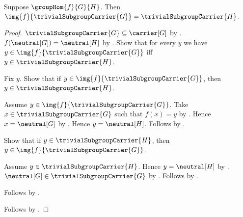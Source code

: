 \begin{proposition}\label{group_hom_image_trivial_subgroup}
    Suppose $\groupHom{f}{G}{H}$.
    Then
        $\img{f}{\trivialSubgroupCarrier{G}}=
            \trivialSubgroupCarrier{H}$.
\end{proposition}
\begin{proof}
    $\trivialSubgroupCarrier{G}\subseteq\carrier[G]$ by
        .
    $f(\neutral[G])=\neutral[H]$ by .
    Show that for every $y$ we have
        $y\in\img{f}{\trivialSubgroupCarrier{G}}$ iff
        $y\in\trivialSubgroupCarrier{H}$.
    \begin{subproof}
        Fix $y$.
        Show that if $y\in\img{f}{\trivialSubgroupCarrier{G}}$, then
            $y\in\trivialSubgroupCarrier{H}$.
        \begin{subproof}
            Assume $y\in\img{f}{\trivialSubgroupCarrier{G}}$.
            Take $x\in\trivialSubgroupCarrier{G}$ such that $f(x)=y$ by
                .
            Hence $x=\neutral[G]$ by
                .
            Hence $y=\neutral[H]$.
            Follows by .
        \end{subproof}
        Show that if $y\in\trivialSubgroupCarrier{H}$, then
            $y\in\img{f}{\trivialSubgroupCarrier{G}}$.
        \begin{subproof}
            Assume $y\in\trivialSubgroupCarrier{H}$.
            Hence $y=\neutral[H]$ by
                .
            $\neutral[G]\in\trivialSubgroupCarrier{G}$ by
                .
            Follows by .
        \end{subproof}
        Follows by \auto.
    \end{subproof}
    Follows by .
\end{proof}

